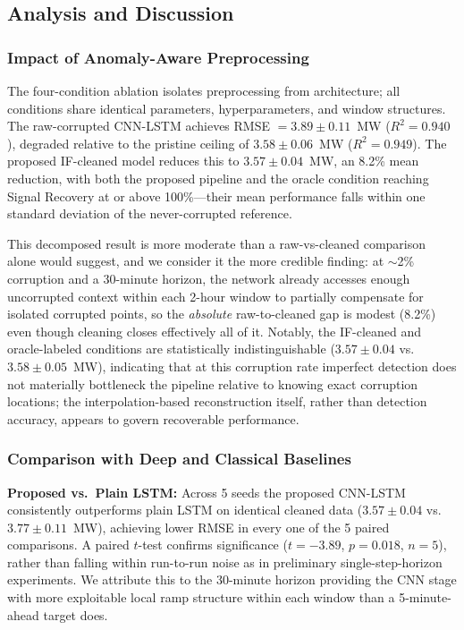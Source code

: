 \documentclass[conference]{IEEEtran}
\begin{document}
\subsection{Analysis and Discussion}

\subsubsection{Impact of Anomaly-Aware Preprocessing}
The four-condition ablation isolates preprocessing from architecture; all conditions share identical parameters, hyperparameters, and window structures. The raw-corrupted CNN-LSTM achieves RMSE $=3.89 \pm 0.11$~MW ($R^2 = 0.940$), degraded relative to the pristine ceiling of $3.58 \pm 0.06$~MW ($R^2 = 0.949$). The proposed IF-cleaned model reduces this to $3.57 \pm 0.04$~MW, an 8.2\% mean reduction, with both the proposed pipeline and the oracle condition reaching Signal Recovery at or above 100\%---their mean performance falls within one standard deviation of the never-corrupted reference.

This decomposed result is more moderate than a raw-vs-cleaned comparison alone would suggest, and we consider it the more credible finding: at $\sim$2\% corruption and a 30-minute horizon, the network already accesses enough uncorrupted context within each 2-hour window to partially compensate for isolated corrupted points, so the \emph{absolute} raw-to-cleaned gap is modest (8.2\%) even though cleaning closes effectively all of it. Notably, the IF-cleaned and oracle-labeled conditions are statistically indistinguishable ($3.57 \pm 0.04$ vs.\ $3.58 \pm 0.05$~MW), indicating that at this corruption rate imperfect detection does not materially bottleneck the pipeline relative to knowing exact corruption locations; the interpolation-based reconstruction itself, rather than detection accuracy, appears to govern recoverable performance.

\subsubsection{Comparison with Deep and Classical Baselines}
\textbf{Proposed vs.\ Plain LSTM:} Across 5 seeds the proposed CNN-LSTM consistently outperforms plain LSTM on identical cleaned data ($3.57 \pm 0.04$ vs.\ $3.77 \pm 0.11$~MW), achieving lower RMSE in every one of the 5 paired comparisons. A paired $t$-test confirms significance ($t=-3.89$, $p=0.018$, $n=5$), rather than falling within run-to-run noise as in preliminary single-step-horizon experiments. We attribute this to the 30-minute horizon providing the CNN stage with more exploitable local ramp structure within each window than a 5-minute-ahead target does.
\end{document}
